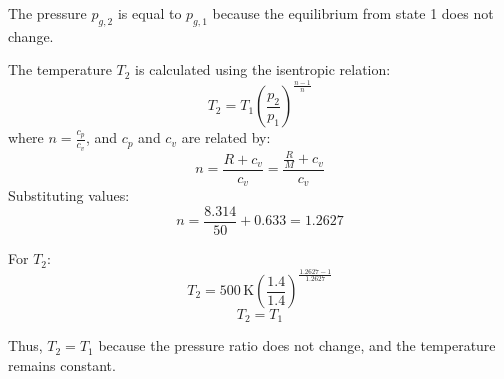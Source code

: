 The pressure \( p_{g,2} \) is equal to \( p_{g,1} \) because the equilibrium from state 1 does not change.  

The temperature \( T_2 \) is calculated using the isentropic relation:  
\[
T_2 = T_1 \left( \frac{p_2}{p_1} \right)^{\frac{n-1}{n}}
\]
where \( n = \frac{c_p}{c_v} \), and \( c_p \) and \( c_v \) are related by:  
\[
n = \frac{R + c_v}{c_v} = \frac{\frac{R}{M} + c_v}{c_v}
\]
Substituting values:  
\[
n = \frac{8.314}{50} + 0.633 = 1.2627
\]

For \( T_2 \):  
\[
T_2 = 500 \, \text{K} \left( \frac{1.4}{1.4} \right)^{\frac{1.2627 - 1}{1.2627}}
\]
\[
T_2 = T_1
\]

Thus, \( T_2 = T_1 \) because the pressure ratio does not change, and the temperature remains constant.